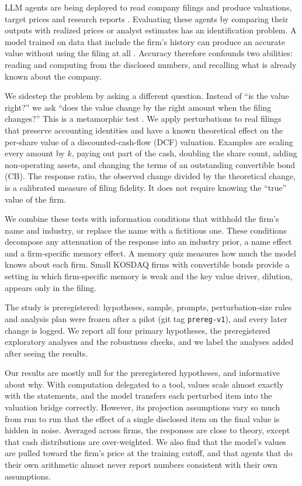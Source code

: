 \documentclass[11pt]{article}
\begin{document}
LLM agents are being deployed to read company filings and produce valuations, target prices and research reports \citep{zhou2024finrobot,haque2026deep}. Evaluating these agents by comparing their outputs with realized prices or analyst estimates has an identification problem. A model trained on data that include the firm's history can produce an accurate value without using the filing at all \citep{lopezlira2025memorization,gao2025detecting,glasserman2023assessing}. Accuracy therefore confounds two abilities: reading and computing from the disclosed numbers, and recalling what is already known about the company.

We sidestep the problem by asking a different question. Instead of ``is the value right?'' we ask ``does the value change by the right amount when the filing changes?'' This is a metamorphic test \citep{chen2018metamorphic}. We apply perturbations to real filings that preserve accounting identities and have a known theoretical effect on the per-share value of a discounted-cash-flow (DCF) valuation. Examples are scaling every amount by $k$, paying out part of the cash, doubling the share count, adding non-operating assets, and changing the terms of an outstanding convertible bond (CB). The response ratio, the observed change divided by the theoretical change, is a calibrated measure of filing fidelity. It does not require knowing the ``true'' value of the firm.

We combine these tests with information conditions that withhold the firm's name and industry, or replace the name with a fictitious one. These conditions decompose any attenuation of the response into an industry prior, a name effect and a firm-specific memory effect. A memory quiz measures how much the model knows about each firm. Small KOSDAQ firms with convertible bonds provide a setting in which firm-specific memory is weak and the key value driver, dilution, appears only in the filing.

The study is preregistered: hypotheses, sample, prompts, perturbation-size rules and analysis plan were frozen after a pilot (git tag \texttt{prereg-v1}), and every later change is logged. We report all four primary hypotheses, the preregistered exploratory analyses and the robustness checks, and we label the analyses added after seeing the results.

Our results are mostly null for the preregistered hypotheses, and informative about why. With computation delegated to a tool, values scale almost exactly with the statements, and the model transfers each perturbed item into the valuation bridge correctly. However, its projection assumptions vary so much from run to run that the effect of a single disclosed item on the final value is hidden in noise. Averaged across firms, the responses are close to theory, except that cash distributions are over-weighted. We also find that the model's values are pulled toward the firm's price at the training cutoff, and that agents that do their own arithmetic almost never report numbers consistent with their own assumptions.
\end{document}
